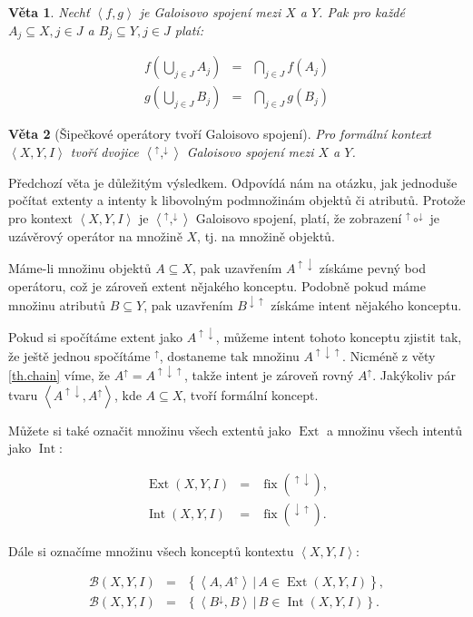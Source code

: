 \documentclass[12pt]{article}
\newcommand{\sep}{\,|\,}
\newcommand{\adds}[1]{\left\{#1\right\}}
\newcommand{\addsp}[1]{\left<#1\right>}
\DeclareMathOperator{\fix}{fix}
\DeclareMathOperator{\ext}{Ext}
\DeclareMathOperator{\intfca}{Int}
\newcommand{\context}{\addsp{X, Y, I}}
\newcommand{\lattice}{\mathcal{B}(X, Y, I)}
\newcommand{\up}{^{\uparrow}}
\newcommand{\down}{^{\downarrow}}
\newcommand{\updown}{^{\uparrow\downarrow}}
\newcommand{\downup}{^{\downarrow\uparrow}}
\newtheorem{theorem}{Věta}
\begin{document}
\begin{theorem}
Nechť $\addsp{f,g}$ je Galoisovo spojení mezi $X$ a $Y$. Pak pro každé $A_j\subseteq X, j\in J$ a $B_j\subseteq Y, j\in J$ platí:

\begin{eqnarray}
f(\bigcup_{j\in J}A_j)&=&\bigcap_{j\in J}f(A_j)\\
g(\bigcup_{j\in J}B_j)&=&\bigcap_{j\in J}g(B_j)
\end{eqnarray}
\end{theorem}

\begin{theorem}[Šipečkové operátory tvoří Galoisovo spojení]
Pro formální kontext $\context$ tvoří dvojice $\addsp{\up, \down}$ Galoisovo spojení mezi $X$ a $Y$.
\end{theorem}

Předchozí věta je důležitým výsledkem. Odpovídá nám na otázku, jak jednoduše počítat extenty a intenty k libovolným podmnožinám objektů či atributů. Protože pro kontext $\context$ je $\addsp{\up, \down}$ Galoisovo spojení, platí, že zobrazení $\up\circ\down$ je uzávěrový operátor na množině $X$, tj. na množině objektů. 

Máme-li množinu objektů $A \subseteq X$, pak uzavřením $A\updown$ získáme pevný bod operátoru, což je zároveň extent nějakého konceptu. Podobně pokud máme množinu atributů $B \subseteq Y$, pak uzavřením $B\downup$ získáme intent nějakého konceptu. 

Pokud si spočítáme extent jako $A\updown$, můžeme intent tohoto konceptu zjistit tak, že ještě jednou spočítáme $\up$, dostaneme tak množinu $A^{\uparrow\downarrow\uparrow}$. Nicméně z věty \ref{th.chain} víme, že $A\up = A^{\uparrow\downarrow\uparrow}$, takže intent je zároveň rovný $A\up$. Jakýkoliv pár tvaru $\addsp{A\updown, A\up}$, kde $A\subseteq X$, tvoří formální koncept. 

Můžete si také označit množinu všech extentů jako $\ext$ a množinu všech intentů jako $\intfca$:

\begin{eqnarray}
\ext(X, Y, I)&=&\fix(\updown),\\
\intfca(X, Y, I)&=&\fix(\downup).
\end{eqnarray}

Dále si označíme množinu všech konceptů kontextu $\addsp{X,Y,I}$:

\begin{eqnarray}
\lattice&=&\adds{\addsp{A, A\up}\sep A\in\ext(X,Y,I)},\\
\lattice&=&\adds{\addsp{B\down, B}\sep B\in\intfca(X,Y,I)}.
\end{eqnarray}
\end{document}
